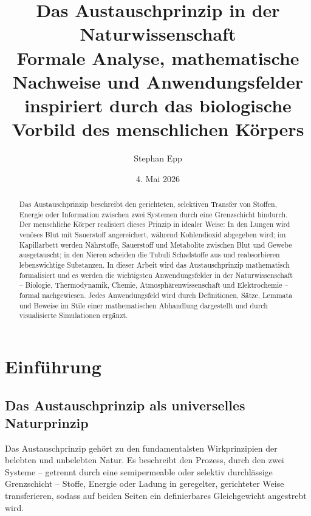 ﻿\documentclass[a4paper,12pt]{article}
\title{\textbf{Das Austauschprinzip in der Naturwissenschaft}\\
\large Formale Analyse, mathematische Nachweise und Anwendungsfelder\\
inspiriert durch das biologische Vorbild des menschlichen Körpers}
\author{Stephan Epp}
\date{4. Mai 2026}
\theoremstyle{definition}
\begin{document}
\maketitle

\begin{abstract}
\noindent
Das Austauschprinzip beschreibt den gerichteten, selektiven Transfer von Stoffen, Energie
oder Information zwischen zwei Systemen durch eine Grenzschicht hindurch. Der menschliche
Körper realisiert dieses Prinzip in idealer Weise: In den Lungen wird venöses Blut mit
Sauerstoff angereichert, während Kohlendioxid abgegeben wird; im Kapillarbett werden
Nährstoffe, Sauerstoff und Metabolite zwischen Blut und Gewebe ausgetauscht; in den Nieren
scheiden die Tubuli Schadstoffe aus und reabsorbieren lebenswichtige Substanzen.
In dieser Arbeit wird das Austauschprinzip mathematisch formalisiert und es werden
die wichtigsten Anwendungsfelder in der Naturwissenschaft -- Biologie, Thermodynamik,
Chemie, Atmosphärenwissenschaft und Elektrochemie -- formal nachgewiesen.
Jedes Anwendungsfeld wird durch Definitionen, Sätze, Lemmata und Beweise
im Stile einer mathematischen Abhandlung dargestellt und durch visualisierte
Simulationen ergänzt.
\end{abstract}

\tableofcontents
\newpage

\section{Einführung}

\subsection{Das Austauschprinzip als universelles Naturprinzip}

Das Austauschprinzip gehört zu den fundamentalsten Wirkprinzipien der belebten und
unbelebten Natur. Es beschreibt den Prozess, durch den zwei Systeme -- getrennt durch eine
semipermeable oder selektiv durchlässige Grenzschicht -- Stoffe, Energie oder Ladung in
geregelter, gerichteter Weise transferieren, sodass auf beiden Seiten ein definierbares
Gleichgewicht angestrebt wird.
\end{document}
